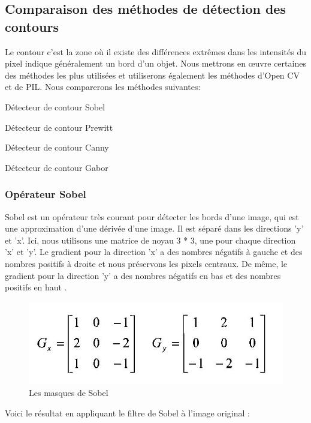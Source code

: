 \documentclass[12pt, openany]{report}
\begin{document}
\subsection{Comparaison des méthodes de détection des contours}
Le contour c’est la zone où il existe des différences extrêmes dans les intensités du pixel indique généralement un bord d'un objet.
Nous mettrons en œuvre certaines des méthodes les plus utilisées et utiliserons également les méthodes d'Open CV et de PIL.\cite{comparaison}
\noindent Nous comparerons les méthodes suivantes:
\begin{mylist}
\item Détecteur de contour Sobel
\item Détecteur de contour Prewitt
\item Détecteur de contour Canny
\item Détecteur de contour Gabor
\end{mylist}

\subsubsection{Opérateur Sobel}
Sobel est un opérateur très courant pour détecter les bords d'une image, qui est une approximation d'une dérivée d'une image. Il est séparé dans les directions 'y' et 'x'. Ici, nous utilisons une matrice de noyau 3 * 3, une pour chaque direction 'x' et 'y'. Le gradient pour la direction 'x' a des nombres négatifs à gauche et des nombres positifs à droite et nous préservons les pixels centraux. De même, le gradient pour la direction 'y' a des nombres négatifs en bas et des nombres positifs en haut .

\begin{figure}[H]
\centering
\includegraphics[scale=0.9]{sobel_masque.jpg}
\caption{Les masques de Sobel}
\end{figure}

Voici le résultat en appliquant le filtre de Sobel à l'image original :
\end{document}
